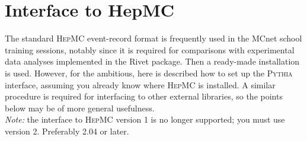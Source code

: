 \documentclass[12pt,a4paper]{article}
\begin{document}
\section{Interface to HepMC}

The standard \textsc{HepMC} event-record format is frequently used 
in the MCnet school training sessions, notably since it is required
for comparisons with experimental data analyses implemented in the  
Rivet package. Then a ready-made installation is used. However, 
for the ambitious, here is described how to set up the \textsc{Pythia} 
interface, assuming you already know where \textsc{HepMC} is installed.
A similar procedure is required for interfacing to other external 
libraries, so the points below may be of more general usefulness.\\
\textit{Note:} the interface to \textsc{HepMC} version 1 is no longer 
supported; you must use version 2. Preferably 2.04 or later.
\end{document}
